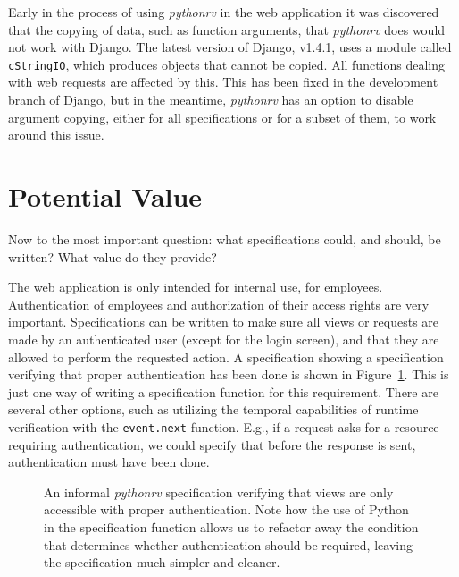 \documentclass[a4paper,11pt]{kth-mag}
\begin{document}
Early in the process of using \textit{pythonrv} in the web application it was
discovered that the copying of data, such as function arguments, that
\textit{pythonrv} does would not work with Django. The latest version of
Django, v1.4.1, uses a module called \texttt{cStringIO}, which produces objects
that cannot be copied. All functions dealing with web requests are affected by
this. This has been fixed in the development branch of Django, but in the
meantime, \textit{pythonrv} has an option to disable argument copying, either
for all specifications or for a subset of them, to work around this issue.


\section{Potential Value}

Now to the most important question: what specifications could, and should, be
written? What value do they provide?

The web application is only intended for internal use, for employees.
Authentication of employees and authorization of their access rights are very
important. Specifications can be written to make sure all views or requests are
made by an authenticated user (except for the login screen), and that they are
allowed to perform the requested action. A specification showing a
specification verifying that proper authentication has been done is shown in
Figure~\ref{figure-app-authentication-informal}. This is just one way of
writing a specification function for this requirement. There are several other
options, such as utilizing the temporal capabilities of runtime verification
with the \texttt{event.next} function. E.g., if a request asks for a resource
requiring authentication, we could specify that before the response is sent,
authentication must have been done.

\begin{figure}[h!]
	\begin{center}
	\begin{minipage}{0.9\textwidth}
	
	\end{minipage}
	\end{center}

  \caption{An informal \textit{pythonrv} specification verifying that views are
    only accessible with proper authentication. Note how the use of Python in
    the specification function allows us to refactor away the condition that
    determines whether authentication should be required, leaving the
    specification much simpler and cleaner.}
	\label{figure-app-authentication-informal}
\end{figure}
\end{document}
